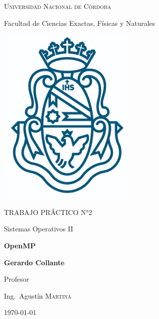 \documentclass[a4paper]{article}
\begin{document}
\begin{titlepage}
	
	{\scshape\LARGE Universidad Nacional de Córdoba \par}
	{\Large Facultad de Ciencias Exactas, Físicas y Naturales \par}
	\vspace{0.5cm}
	\centering
	\includegraphics[width=0.5\textwidth]{unc.png}
	\par\vspace{0.5cm}
	\vspace{0.5cm}
	{\scshape\Large TRABAJO PRÁCTICO N°2\par}
	{\large Sistemas Operativos II\par}
	\vspace{1.5cm}
	{\large\bfseries OpenMP \par}
	\vspace{1.5cm}
	{\Large\bfseries Gerardo Collante\par}
	\vfill
	Profesor\par
	Ing.~Agustín \textsc{Martina}

	\vfill

	{\large \today\par}
\end{titlepage}


\tableofcontents
\end{document}

